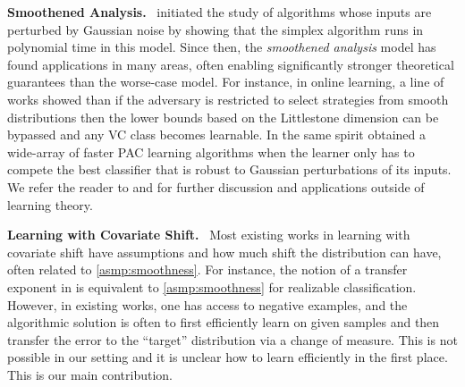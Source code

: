 \documentclass[11pt]{article}
\theoremstyle{plain}
\theoremstyle{definition}
\theoremstyle{remark}
\renewcommand{\paragraph}[1]{\medskip \noindent\textbf{#1}~}
\begin{document}
            
 

        \paragraph{Smoothened Analysis.} 
            \citet{spielman2004smooth} initiated the study of algorithms whose inputs are perturbed by Gaussian noise by showing that the simplex algorithm runs in polynomial time in this model. 
            Since then, the \textit{smoothened analysis} model has found applications in many areas, often enabling significantly stronger theoretical guarantees than the worse-case model. 
            For instance, in online learning, a line of works \cite{haghtalab2022efficientSmooth,haghtalab2020smooth,haghtalab2024smoothJACM,block2024performanceempiricalriskminimization,blanchard2024agnostic} showed than if the adversary is restricted to select strategies from smooth distributions then the lower bounds based on the Littlestone dimension can be bypassed and any VC class becomes learnable.
            In the same spirit \citet*{pmlr-v247-chandrasekaran24a} obtained a wide-array of faster PAC learning algorithms when the learner only has to compete the best classifier that is robust to Gaussian perturbations of its inputs.
            We refer the reader to \cite[Chapter 13]{roughgarden2021beyond} and \cite{beier2004typical} for further discussion and applications outside of learning theory.
            
             

        \paragraph{Learning with Covariate Shift.}
            Most existing works in learning with covariate shift \cite{yishay_2009_domain_adapt,yishay_2009_multi_source_renyi,theory2010david,pmlr-v9-david10a,sugiyama2012machine,kalai2021arbitraryCS,pmlr-v75-kpotufe18a,pathak2022new,goel2024tolerantalgorithmslearningarbitrary,Weiss2016transfersurvey}
            have assumptions and how much shift the distribution can have, often related to \cref{asmp:smoothness}. For instance, the notion of a transfer exponent in \cite{hanneke_kpotufe_2019_transfer_exp,hanneke2023efficient,hanneke2024unifiedtheorytransferlearning} is equivalent to \cref{asmp:smoothness} for realizable classification. However, in existing works, one has access to negative examples, and the algorithmic solution is often to first efficiently learn on given samples and then transfer the error to the ``target'' distribution via a change of measure.
            This is not possible in our setting and it is unclear how to learn efficiently in the first place. This is our main contribution.
\end{document}
